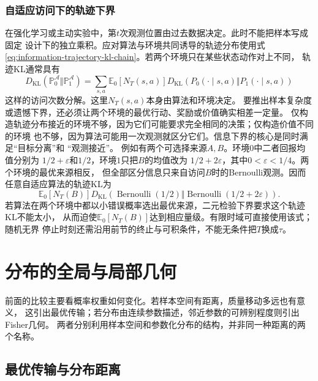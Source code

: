 \subsubsection{自适应访问下的轨迹下界}
在强化学习或主动实验中，第\(t\)次观测位置由过去数据决定。此时不能把样本写成固定
设计下的独立乘积。应对算法与环境共同诱导的轨迹分布使用式
\eqref{eq:information-trajectory-kl-chain}。若两个环境只在某些状态动作对上不同，
轨迹KL通常具有
\[
  D_{\mathrm{KL}}(\mathbb{P}_0^\mathcal{A}
  \Vert\mathbb{P}_1^\mathcal{A})
  =
  \sum_{s,a}
  \mathbb{E}_0[N_T(s,a)]
  D_{\mathrm{KL}}\!\left(
    P_0(\cdot\mid s,a)\Vert P_1(\cdot\mid s,a)
  \right)
\]
这样的访问次数分解。这里\(N_T(s,a)\)本身由算法和环境决定。
要推出样本复杂度或遗憾下界，还必须让两个环境的最优行动、奖励或价值确实相差一定量。
仅构造轨迹分布接近的环境不够，因为它们可能要求完全相同的决策；仅构造价值不同的环境
也不够，因为算法可能用一次观测就区分它们。信息下界的核心是同时满足“目标分离”和
“观测接近”。
例如有两个可选择来源\(A,B\)。环境\(0\)中二者回报均值分别为
\(1/2+\varepsilon\)和\(1/2\)，环境\(1\)只把\(B\)的均值改为
\(1/2+2\varepsilon\)，其中\(0<\varepsilon<1/4\)。两个环境的最优来源相反，
但全部区分信息只来自访问\(B\)时的Bernoulli观测。因而任意自适应算法的轨迹KL为
\[
  \mathbb{E}_0[N_T(B)]
  D_{\mathrm{KL}}\!\left(
    \operatorname{Bernoulli}(1/2)
    \Vert
    \operatorname{Bernoulli}(1/2+2\varepsilon)
  \right).
\]
若算法在两个环境中都以小错误概率选出最优来源，二元检验下界要求这个轨迹KL不能太小，
从而迫使\(\mathbb{E}_0[N_T(B)]\)达到相应量级。有限时域可直接使用该式；随机无界
停止时刻还需沿用前节的终止与可积条件，不能无条件把\(T\)换成\(\tau\)。
\section{分布的全局与局部几何}
\label{sec:information-global-local-geometry}

前面的比较主要看概率权重如何变化。若样本空间有距离，质量移动多远也有意义，
这引出最优传输；若分布由连续参数描述，邻近参数的可辨别程度则引出Fisher几何。
两者分别利用样本空间和参数化分布的结构，并非同一种距离的两个名称。

\subsection{最优传输与分布距离}
\label{sec:information-optimal-transport}
